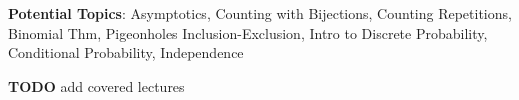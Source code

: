 \documentclass[handout]{mcs}
\begin{document}
\renewcommand{\reading}{
\begin{itemize}
\item
  Chapter~\bref{sec:coloring}--\bref{trees-sec}.\ \emph{Simple
    Graphs: Coloring, Connectedness}

\item Chapter~\bref{chap:asymptotics}
  through~\bref{sec:closed_products}.\ \emph{Sums \& Series}
  (omit~\bref{doublesum_sec})
\end{itemize}}


\begin{staffnotes}
\textbf{Potential Topics}: Asymptotics, Counting with Bijections,
Counting Repetitions, Binomial Thm, Pigeonholes Inclusion-Exclusion,
Intro to Discrete Probability, Conditional Probability, Independence

\textbf{TODO} add covered lectures
\end{staffnotes}






\end{document}
